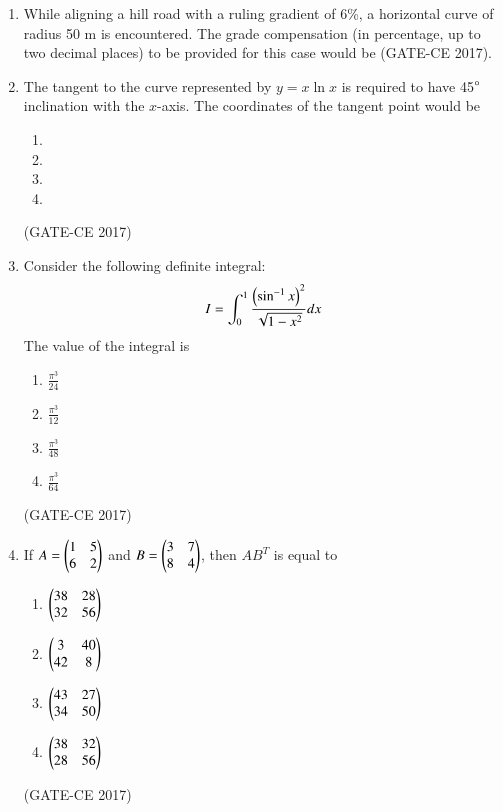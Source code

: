 \documentclass[journal,12pt,onecolumn]{article}
\theoremstyle{remark}
\begin{document}
\begin{enumerate}
    \item While aligning a hill road with a ruling gradient of 6\%, a horizontal curve of radius 50 m is encountered. The grade compensation (in percentage, up to two decimal places) to be provided for this case would be \underline{\hspace{3cm}} \hfill (GATE-CE 2017).

    \item The tangent to the curve represented by $ y = x \ln x $ is required to have 45$\degree$ inclination with the $ x $-axis. The coordinates of the tangent point would be
    \begin{multicols}{4}
    \begin{enumerate}
        \item {}  
        \item {}  
        \item {}  
        \item {}  
    \end{enumerate}
    \end{multicols}
 \hfill (GATE-CE 2017)

    \item Consider the following definite integral:
    \begin{align}
    I = \int_{0}^{1} \frac{\left(\sin^{-1} x\right)^2}{\sqrt{1 - x^2}} dx
    \end{align}
    The value of the integral is
    \begin{multicols}{4}
    \begin{enumerate}
        \item $\frac{\pi^3}{24}$  
        \item $\frac{\pi^3}{12}$  
        \item $\frac{\pi^3}{48}$  
        \item $\frac{\pi^3}{64}$  
    \end{enumerate}
    \end{multicols}
   \hfill (GATE-CE 2017)

    \item If $ A = \begin{pmatrix}1 & 5 \\ 6 & 2\end{pmatrix} $ and $ B = \begin{pmatrix} 3 & 7 \\ 8 & 4\end{pmatrix} $, then $ AB^T $ is equal to
    \begin{multicols}{4}
    \begin{enumerate}
        \item $\begin{pmatrix} 38 & 28 \\ 32 & 56 \end{pmatrix}$  
        \item $\begin{pmatrix} 3 & 40 \\ 42 & 8 \end{pmatrix}$  
        \item $\begin{pmatrix} 43 & 27 \\ 34 & 50 \end{pmatrix}$  
        \item $\begin{pmatrix} 38 & 32 \\ 28 & 56 \end{pmatrix}$  
    \end{enumerate}
    \end{multicols}
   \hfill (GATE-CE 2017)


\end{enumerate}
\end{document}
